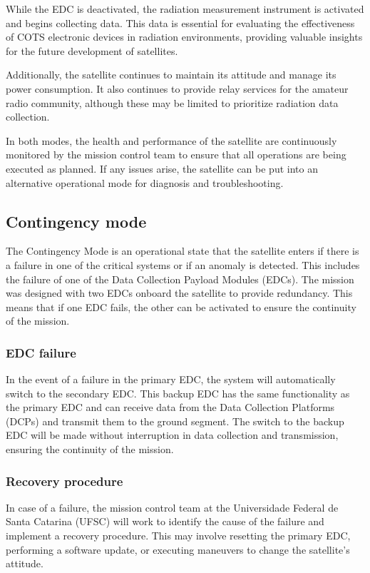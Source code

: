 While the EDC is deactivated, the radiation measurement instrument is activated and begins collecting data. This data is essential for evaluating the effectiveness of COTS electronic devices in radiation environments, providing valuable insights for the future development of satellites.

Additionally, the satellite continues to maintain its attitude and manage its power consumption. It also continues to provide relay services for the amateur radio community, although these may be limited to prioritize radiation data collection.

In both modes, the health and performance of the satellite are continuously monitored by the mission control team to ensure that all operations are being executed as planned. If any issues arise, the satellite can be put into an alternative operational mode for diagnosis and troubleshooting.

\subsection{Contingency mode}

The Contingency Mode is an operational state that the satellite enters if there is a failure in one of the critical systems or if an anomaly is detected. This includes the failure of one of the Data Collection Payload Modules (EDCs). The mission was designed with two EDCs onboard the satellite to provide redundancy. This means that if one EDC fails, the other can be activated to ensure the continuity of the mission.

\subsubsection{EDC failure}

In the event of a failure in the primary EDC, the system will automatically switch to the secondary EDC. This backup EDC has the same functionality as the primary EDC and can receive data from the Data Collection Platforms (DCPs) and transmit them to the ground segment. The switch to the backup EDC will be made without interruption in data collection and transmission, ensuring the continuity of the mission.

\subsubsection{Recovery procedure}

In case of a failure, the mission control team at the Universidade Federal de Santa Catarina (UFSC) will work to identify the cause of the failure and implement a recovery procedure. This may involve resetting the primary EDC, performing a software update, or executing maneuvers to change the satellite's attitude.

